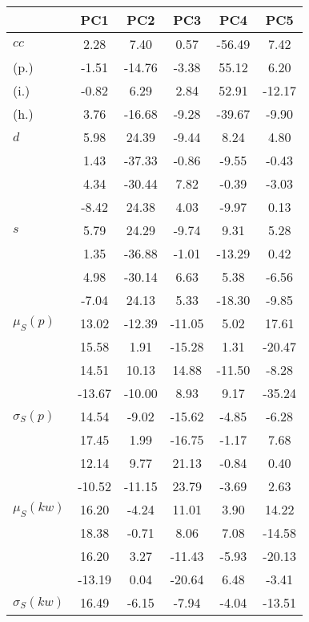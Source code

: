\begin{table}[h!]
\begin{center}
\begin{tabular}{| l | c | c | c | c | c |}\hline
 & PC1 & PC2 & PC3 & PC4 & PC5 \\\hline
$cc$ & 2.28  & 7.40  & 0.57  & -56.49  & 7.42 \\\hline
(p.) & -1.51  & -14.76  & -3.38  & 55.12  & 6.20 \\\hline
(i.) & -0.82  & 6.29  & 2.84  & 52.91  & -12.17 \\\hline
(h.) & 3.76  & -16.68  & -9.28  & -39.67  & -9.90 \\\hline
$d$ & 5.98  & 24.39  & -9.44  & 8.24  & 4.80 \\\hline
 & 1.43  & -37.33  & -0.86  & -9.55  & -0.43 \\\hline
 & 4.34  & -30.44  & 7.82  & -0.39  & -3.03 \\\hline
 & -8.42  & 24.38  & 4.03  & -9.97  & 0.13 \\\hline
$s$ & 5.79  & 24.29  & -9.74  & 9.31  & 5.28 \\\hline
 & 1.35  & -36.88  & -1.01  & -13.29  & 0.42 \\\hline
 & 4.98  & -30.14  & 6.63  & 5.38  & -6.56 \\\hline
 & -7.04  & 24.13  & 5.33  & -18.30  & -9.85 \\\hline
$\mu_S(p)$ & 13.02  & -12.39  & -11.05  & 5.02  & 17.61 \\\hline
 & 15.58  & 1.91  & -15.28  & 1.31  & -20.47 \\\hline
 & 14.51  & 10.13  & 14.88  & -11.50  & -8.28 \\\hline
 & -13.67  & -10.00  & 8.93  & 9.17  & -35.24 \\\hline
$\sigma_S(p)$ & 14.54  & -9.02  & -15.62  & -4.85  & -6.28 \\\hline
 & 17.45  & 1.99  & -16.75  & -1.17  & 7.68 \\\hline
 & 12.14  & 9.77  & 21.13  & -0.84  & 0.40 \\\hline
 & -10.52  & -11.15  & 23.79  & -3.69  & 2.63 \\\hline
$\mu_S(kw)$ & 16.20  & -4.24  & 11.01  & 3.90  & 14.22 \\\hline
 & 18.38  & -0.71  & 8.06  & 7.08  & -14.58 \\\hline
 & 16.20  & 3.27  & -11.43  & -5.93  & -20.13 \\\hline
 & -13.19  & 0.04  & -20.64  & 6.48  & -3.41 \\\hline
$\sigma_S(kw)$ & 16.49  & -6.15  & -7.94  & -4.04  & -13.51 \\\hline

\end{tabular}
\end{center}
\end{table}
